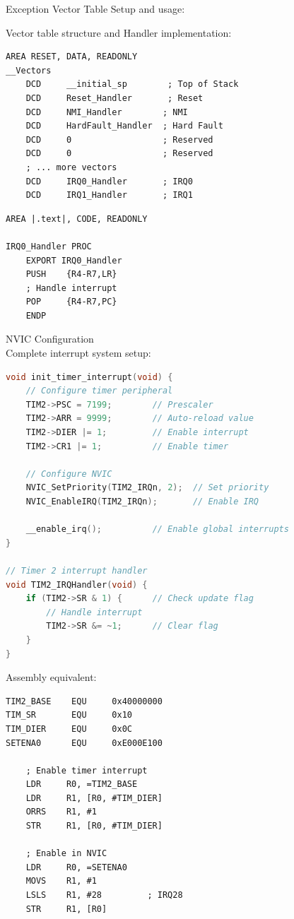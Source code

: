 \begin{KR}{Exception Vector Table}
Setup and usage:

Vector table structure and Handler implementation:
\begin{lstlisting}[language=armasm, style=basesmol]
    AREA RESET, DATA, READONLY
__Vectors
    DCD     __initial_sp        ; Top of Stack
    DCD     Reset_Handler       ; Reset
    DCD     NMI_Handler        ; NMI
    DCD     HardFault_Handler  ; Hard Fault
    DCD     0                  ; Reserved
    DCD     0                  ; Reserved
    ; ... more vectors
    DCD     IRQ0_Handler       ; IRQ0
    DCD     IRQ1_Handler       ; IRQ1
\end{lstlisting}
\vspace{-2mm}
\begin{lstlisting}[language=armasm, style=basesmol]
    AREA |.text|, CODE, READONLY
    
IRQ0_Handler PROC
    EXPORT IRQ0_Handler
    PUSH    {R4-R7,LR}
    ; Handle interrupt
    POP     {R4-R7,PC}
    ENDP
\end{lstlisting}
\end{KR}

\begin{example2}{NVIC Configuration}\\
Complete interrupt system setup:

\begin{lstlisting}[language=C, style=basesmol]
void init_timer_interrupt(void) {
    // Configure timer peripheral
    TIM2->PSC = 7199;        // Prescaler
    TIM2->ARR = 9999;        // Auto-reload value
    TIM2->DIER |= 1;         // Enable interrupt
    TIM2->CR1 |= 1;          // Enable timer
    
    // Configure NVIC
    NVIC_SetPriority(TIM2_IRQn, 2);  // Set priority
    NVIC_EnableIRQ(TIM2_IRQn);       // Enable IRQ
    
    __enable_irq();          // Enable global interrupts
}

// Timer 2 interrupt handler
void TIM2_IRQHandler(void) {
    if (TIM2->SR & 1) {      // Check update flag
        // Handle interrupt
        TIM2->SR &= ~1;      // Clear flag
    }
}
\end{lstlisting}

Assembly equivalent:
\begin{lstlisting}[language=armasm, style=basesmol]
TIM2_BASE    EQU     0x40000000
TIM_SR       EQU     0x10
TIM_DIER     EQU     0x0C
SETENA0      EQU     0xE000E100

    ; Enable timer interrupt
    LDR     R0, =TIM2_BASE
    LDR     R1, [R0, #TIM_DIER]
    ORRS    R1, #1
    STR     R1, [R0, #TIM_DIER]
    
    ; Enable in NVIC
    LDR     R0, =SETENA0
    MOVS    R1, #1
    LSLS    R1, #28         ; IRQ28
    STR     R1, [R0]
\end{lstlisting}
\end{example2}


